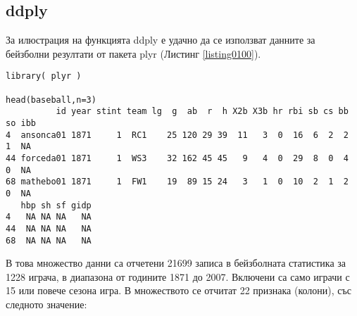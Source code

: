 \subsection{ddply}

За илюстрация на функцията ddply е удачно да се използват данните за бейзболни резултати от пакета plyr (Листинг \ref{listing0100}).

\begin{lstlisting}[caption=Бейзболна статистика, label=listing0100]
library( plyr )

head(baseball,n=3)
          id year stint team lg  g  ab  r  h X2b X3b hr rbi sb cs bb so ibb
4  ansonca01 1871     1  RC1    25 120 29 39  11   3  0  16  6  2  2  1  NA
44 forceda01 1871     1  WS3    32 162 45 45   9   4  0  29  8  0  4  0  NA
68 mathebo01 1871     1  FW1    19  89 15 24   3   1  0  10  2  1  2  0  NA
   hbp sh sf gidp
4   NA NA NA   NA
44  NA NA NA   NA
68  NA NA NA   NA
\end{lstlisting}

В това множество данни са отчетени 21699 записа в бейзболната статистика за 1228 играча, в диапазона от годините 1871 до 2007. Включени са само играчи с 15 или повече сезона игра. В множеството се отчитат 22 признака (колони), със следното значение:

